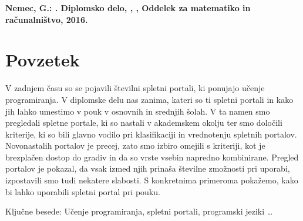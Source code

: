 \textbf{Nemec, G.: \podnaslov. Diplomsko delo, \univerza, \fakulteta,
Oddelek za matematiko in računalništvo, 2016.}

\section*{Povzetek}
\label{sec:povzetek}

V zadnjem času so se pojavili številni spletni portali, ki ponujajo
učenje programiranja. V diplomske delu nas zanima, kateri so ti spletni
portali in kako jih lahko umestimo v pouk v osnovnih in srednjih
šolah. V ta namen smo pregledali spletne portale, ki so nastali v
akademskem okolju ter smo določili kriterije, ki so bili glavno
vodilo pri klasifikaciji in vrednotenju spletnih portalov. Novonastalih portalov je precej, zato smo izbiro omejili s kriteriji, kot
je brezplačen dostop do gradiv in da so vrste vsebin napredno
kombinirane. Pregled portalov je pokazal, da vsak izmed njih prinaša
številne zmožnosti pri uporabi, izpostavili smo tudi nekatere
slabosti. S konkretnima primeroma pokažemo, kako bi lahko uporabili
spletni portal pri pouku. 


Ključne besede: Učenje programiranja, spletni portali, programski
jeziki \dots

